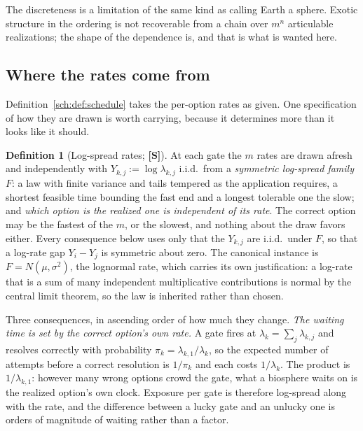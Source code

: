 \documentclass[11pt]{article}
\theoremstyle{plain}
\theoremstyle{definition}
\newtheorem{definition}[theorem]{Definition}
\theoremstyle{remark}
\begin{document}
The discreteness is a limitation of the same kind as calling Earth a
sphere. Exotic structure in the ordering is not recoverable from a chain
over $m^n$ articulable realizations; the shape of the dependence is, and
that is what is wanted here.

\subsection{Where the rates come from}\label{sch:subsub:rates}

Definition~\ref{sch:def:schedule} takes the per-option rates as given.
One specification of how they are drawn is worth carrying, because it
determines more than it looks like it should.

\begin{definition}[Log-spread rates; \textbf{[S]}]\label{sch:def:rates}
At each gate the $m$ rates are drawn afresh and independently with
$Y_{k,j}:=\log\lambda_{k,j}$ i.i.d.\ from a \emph{symmetric log-spread
family} $F$: a law with finite variance and tails tempered as the
application requires, a shortest feasible time bounding the fast end
and a longest tolerable one the slow; and \emph{which option is the
realized one is independent of its rate}. The correct option may be the
fastest of the $m$, or the slowest, and nothing about the draw favors
either. Every consequence below uses only that the $Y_{k,j}$ are
i.i.d.\ under $F$, so that a log-rate gap $Y_i-Y_j$ is symmetric about
zero. The canonical instance is $F=N(\mu,\sigma^2)$, the lognormal
rate, which carries its own justification: a log-rate that is a sum of
many independent multiplicative contributions is normal by the central
limit theorem, so the law is inherited rather than chosen.
\end{definition}

Three consequences, in ascending order of how much they change. \emph{The waiting time is set by the correct option's own rate.} A gate
fires at $\lambda_k=\sum_j\lambda_{k,j}$ and resolves correctly with
probability $\pi_k=\lambda_{k,1}/\lambda_k$, so the expected number of
attempts before a correct resolution is $1/\pi_k$ and each costs
$1/\lambda_k$. The product is $1/\lambda_{k,1}$: however many wrong
options crowd the gate, what a biosphere waits on is the realized
option's own clock. Exposure per gate is therefore log-spread along with
the rate, and the difference between a lucky gate and an unlucky one is
orders of magnitude of waiting rather than a factor.
\end{document}
